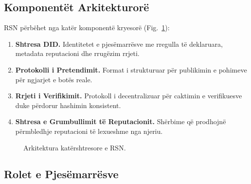 \documentclass[11pt,a4paper,twocolumn]{article}
\begin{document}
\subsection{Komponentët Arkitekturorë}

RSN përbëhet nga katër komponentë kryesorë (Fig.~\ref{fig:architecture}):
\begin{enumerate}[nosep]
\item \textbf{Shtresa DID.} Identitetet e pjesëmarrësve me rregulla të deklaruara, metadata reputacioni dhe rrugëzim rrjeti.
\item \textbf{Protokolli i Pretendimit.} Format i strukturuar për publikimin e pohimeve për ngjarjet e botës reale.
\item \textbf{Rrjeti i Verifikimit.} Protokoll i decentralizuar për caktimin e verifikuesve duke përdorur hashimin konsistent.
\item \textbf{Shtresa e Grumbullimit të Reputacionit.} Shërbime që prodhojnë përmbledhje reputacioni të lexueshme nga njeriu.
\end{enumerate}

\begin{figure}[ht]
\centering
{}
\caption{Arkitektura katërshtresore e RSN.}
\label{fig:architecture}
\end{figure}

\subsection{Rolet e Pjesëmarrësve}
\end{document}
